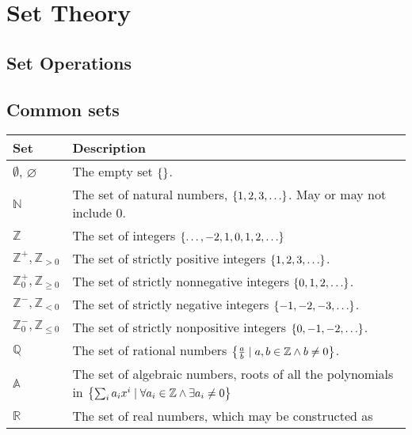 \documentclass[a4paper,11pt]{article}
\begin{document}
    \section{Set Theory}

    \subsection{Set Operations}

    \subsection{Common sets}


    \begin{center}
    \begin{longtable}{ll}
    \toprule
    \bfseries Set & \bfseries Description \\
    \midrule
    \endhead
    $\emptyset$, $\varnothing$ & The empty set $\set{}$. \\
    $\mathbb{N}$ & The set of natural numbers, $\set{1, 2, 3, \ldots}$.
                   May or may not include $0$. \\
    $\mathbb{Z}$ & The set of integers $\set{\ldots, -2, 1, 0, 1, 2, \ldots}$ \\
    $\mathbb{Z}^+, \mathbb{Z}_{> 0}$ & The set of strictly positive integers
                   $\set{1, 2, 3, \ldots}$. \\
    $\mathbb{Z}^+_0, \mathbb{Z}_{\ge 0}$ &
                   The set of strictly nonnegative integers
                   $\set{0, 1, 2, \ldots}$. \\
    $\mathbb{Z}^-, \mathbb{Z}_{< 0}$ & The set of strictly negative integers
                   $\set{-1, -2, -3, \ldots}$. \\
    $\mathbb{Z}^-_0, \mathbb{Z}_{\le 0}$ &
                   The set of strictly nonpositive integers
                   $\set{0, -1, -2, \ldots}$. \\
    $\mathbb{Q}$ & The set of rational numbers
                   $\set{\frac ab \mid a, b \in \mathbb{Z} \land b \neq 0}$.\\
    $\mathbb{A}$ & The set of algebraic numbers, roots of all the polynomials in
                   $\set{\sum_i a_i x^i \mid \forall a_i \in \mathbb{Z} \land
                         \exists a_i \neq 0}$ \\
    $\mathbb{R}$ & The set of real numbers, which may be constructed as

\end{longtable}
\end{center}
\end{document}
